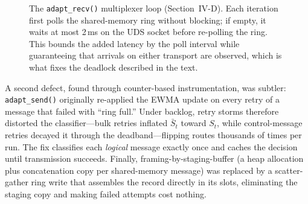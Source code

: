 \documentclass[conference]{IEEEtran}
\newcommand{\sbar}{\bar{S}}
\begin{document}
\begin{figure}[t]
\centering
{}
\caption{The \texttt{adapt\_recv()} multiplexer loop
(Section~IV-D). Each iteration first polls the shared-memory ring without
blocking; if empty, it waits at most 2\,ms on the UDS socket before
re-polling the ring. This bounds the added latency by the poll interval
while guaranteeing that arrivals on either transport are observed,
which is what fixes the deadlock described in the text.}
\label{fig:mux}
\end{figure}

A second defect, found through counter-based instrumentation, was subtler:
\texttt{adapt\_send()} originally re-applied the EWMA update on every
retry of a message that failed with ``ring full.'' Under backlog, retry
storms therefore distorted the classifier---bulk retries inflated
$\sbar_t$ toward $S_t$, while control-message retries decayed it through
the deadband---flipping routes thousands of times per run. The fix classifies
each \emph{logical} message exactly once and caches the decision until
transmission succeeds. Finally, framing-by-staging-buffer (a heap allocation
plus concatenation copy per shared-memory message) was replaced by a
scatter-gather ring write that assembles the record directly in its slots,
eliminating the staging copy and making failed attempts cost nothing.
\end{document}
